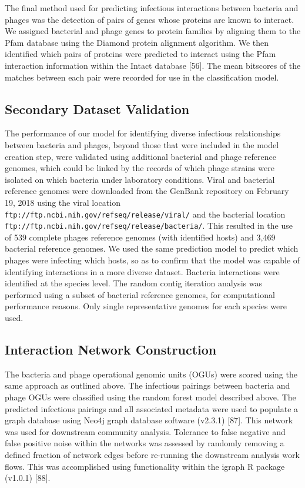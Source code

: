 \documentclass[12pt,]{article}
\begin{document}
The final method used for predicting infectious interactions between
bacteria and phages was the detection of pairs of genes whose proteins
are known to interact. We assigned bacterial and phage genes to protein
families by aligning them to the Pfam database using the Diamond protein
alignment algorithm. We then identified which pairs of proteins were
predicted to interact using the Pfam interaction information within the
Intact database {[}56{]}. The mean bitscores of the matches between each
pair were recorded for use in the classification model.

\subsection{Secondary Dataset
Validation}\label{secondary-dataset-validation}

The performance of our model for identifying diverse infectious
relationships between bacteria and phages, beyond those that were
included in the model creation step, were validated using additional
bacterial and phage reference genomes, which could be linked by the
records of which phage strains were isolated on which bacteria under
laboratory conditions. Viral and bacterial reference genomes were
downloaded from the GenBank repository on February 19, 2018 using the
viral location \texttt{ftp://ftp.ncbi.nih.gov/refseq/release/viral/} and
the bacterial location
\texttt{ftp://ftp.ncbi.nih.gov/refseq/release/bacteria/}. This resulted
in the use of 539 complete phages reference genomes (with identified
hosts) and 3,469 bacterial reference genomes. We used the same
prediction model to predict which phages were infecting which hosts, so
as to confirm that the model was capable of identifying interactions in
a more diverse dataset. Bacteria interactions were identified at the
species level. The random contig iteration analysis was performed using
a subset of bacterial reference genomes, for computational performance
reasons. Only single representative genomes for each species were used.

\subsection{Interaction Network
Construction}\label{interaction-network-construction}

The bacteria and phage operational genomic units (OGUs) were scored
using the same approach as outlined above. The infectious pairings
between bacteria and phage OGUs were classified using the random forest
model described above. The predicted infectious pairings and all
associated metadata were used to populate a graph database using Neo4j
graph database software (v2.3.1) {[}87{]}. This network was used for
downstream community analysis. Tolerance to false negative and false
positive noise within the networks was assessed by randomly removing a
defined fraction of network edges before re-running the downstream
analysis work flows. This was accomplished using functionality within
the igraph R package (v1.0.1) {[}88{]}.
\end{document}
